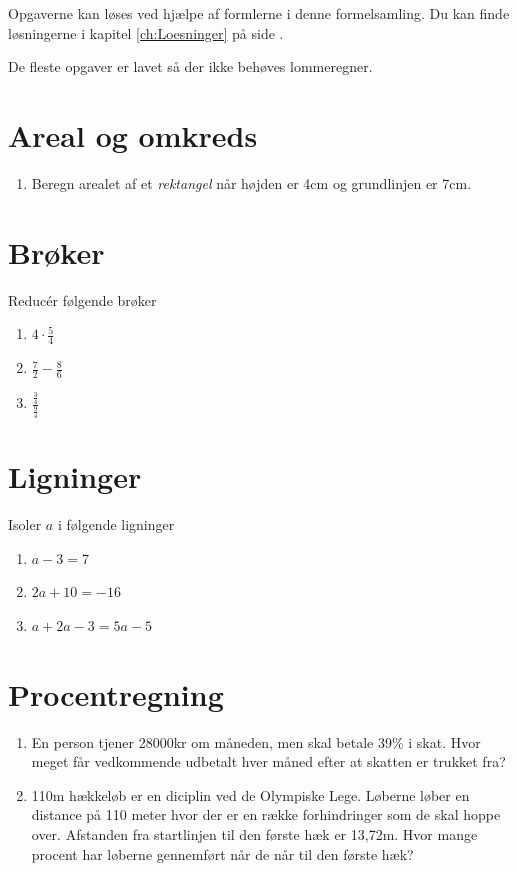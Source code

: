 \documentclass[11pt,a5paper,fleqn,leqno]{book}
\begin{document}
Opgaverne kan løses ved hjælpe af formlerne i denne formelsamling. Du kan finde løsningerne i kapitel \ref{ch:Loesninger} på side \pageref{ch:Loesninger}.

De fleste opgaver er lavet så der ikke behøves lommeregner.

\newpage

\section{Areal og omkreds}

\begin{enumerate}
\item \label{op:areal_1} Beregn arealet af et \textit{rektangel} når højden er 4cm og grundlinjen er 7cm.
\end{enumerate}

\section{Brøker}

Reducér følgende brøker

\begin{enumerate}
\item \label{op:broek_1} $4 \cdot \frac{5}{4}$
\item \label{op:broek_2} $\frac{7}{2} - \frac{8}{6}$
\item \label{op:broek_3} $\frac{\frac{3}{4}}{\frac{9}{4}}$
\end{enumerate}

\section{Ligninger}

Isoler $a$ i følgende ligninger

\begin{enumerate}
\item \label{op:ligning_1} $a-3=7$
\item \label{op:ligning_2} $2a+10=-16$
\item \label{op:ligning_3} $a+2a-3 = 5a -5$
\end{enumerate}

\section{Procentregning}

\begin{enumerate}
\item \label{op:procent_1} En person tjener 28000kr om måneden, men skal betale 39\% i skat. Hvor meget får vedkommende udbetalt hver måned efter at skatten er trukket fra?
\item \label{op:procent_2} 110m hækkeløb er en diciplin ved de Olympiske Lege. Løberne løber en distance på 110 meter hvor der er en række forhindringer som de skal hoppe over. Afstanden fra startlinjen til den første hæk er 13,72m. Hvor mange procent har løberne gennemført når de når til den første hæk?
\end{enumerate}
\end{document}
